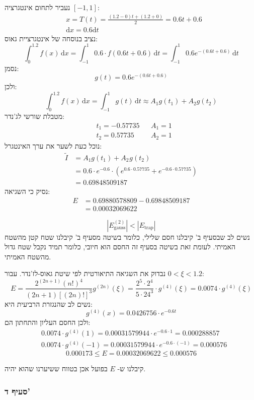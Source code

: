 \documentclass[
  a4paper,
]{article}
\begin{document}
נעביר לתחום אינטגרציה \([-1,1]\): \[\begin{aligned}
 & x=T(t)=\frac{(1.2-0)t+(1.2+0)}{2}=0.6t+0.6 \\[2ex]
 & \mathrm{d}x=0.6\mathrm{d}t
\end{aligned}\] נציב בנוסחה של אינטגרציית גאוס:
\[\int_{0}^{1.2} f(x) \, \mathrm{d}x =\int_{-1}^{1} 0.6\cdot f(0.6t+0.6) \, \mathrm{d}t =\int_{-1}^{1}0.6 e^{-(0.6t+0.6)} \, \mathrm{d}t\]
נסמן: \[g(t)=0.6e^{-(0.6t+0.6)}\] ולכן:
\[\int_{0}^{1.2} f(x) \, \mathrm{d}x =\int_{-1}^{1} g(t) \, \mathrm{d}t\approx {A}_{1}g({t}_{1})+{A}_{2}g({t}_{2}) \]
מטבלת שורשי לג'נדר: \[\begin{aligned}
 & t_{1}=-0.57735 &  &  A_{1}=1 \\[1ex]
 & t_{2}=0.57735 &  &  A_{2}=1
\end{aligned}\] נוכל כעת לשער את ערך האינטגרל: \[\begin{aligned}
\tilde{I}  & = {A_{1}}g(t_{1})+{A_{2}}_{}g(t_{2})\\[2ex]
&=0.6\cdot e^{-0.6}\cdot \left( e^{0.6\cdot 0.57735}+e^{-0.6\cdot 0.57735}\right) \\[2ex]
 & =0.69848509187
\end{aligned}\] נסיק כי השגיאה: \[\begin{aligned}
  E & =0.69880578809-0.69848509187 \\
 & =\boxed{0.00032069622}
\end{aligned}\]

\[\left| E_{\text{gauss}}^{(2)} \right|<\left| E_{\text{trap}} \right|\]
נשים לב שבסעיף ב' קיבלנו חסם שלילי, כלומר בשיטה מסעיף ב' קיבלנו שטח קטן
מהשטח האמיתי. לעומת זאת בשיטה בסעיף זה החסם הוא חיובי, כלומר תמיד נקבל
שטח גדול מהשטח האמיתי.

נבדוק את השגיאה התיאורטית לפי שיטת גאוס-לז'נדר. עבור \(0<\xi<1.2\):
\[E=\frac{2^{(2n+1)}(n!)^{4}}{(2n+1)[(2n)!]^{3}}g^{(2n)}(\xi)=\frac{2^{5}\cdot 2^{4}}{5\cdot 24^{3}}\cdot g^{(4)}(\xi)=0.0074\cdot g^{(4)}(\xi)\]
נשים לב שהנגזרת הרביעית היא: \[g^{(4)}(x)=0.0426756 \cdot e^{-0.6 t}\]
ולכן החסם העליון והתחתון הם: \[\begin{aligned}
&0.0074\cdot g^{(4)}(1)=0.00031579944 \cdot e^{-0.6 \cdot 1}=0.000288857 \\
&0.0074\cdot g^{(4)}(-1)=0.00031579944 \cdot e^{-0.6 \cdot (-1)}=0.000576
\end{aligned}\] \[\boxed{0.000173\leq E=0.00032069622\leq 0.000576}\]

קיבלנו ש- \(E\) בפועל אכן בטווח ששיערנו שהוא יהיה.

\subsubsection{סעיף ד'}\label{ux5e1ux5e2ux5d9ux5e3-ux5d3}
\end{document}
